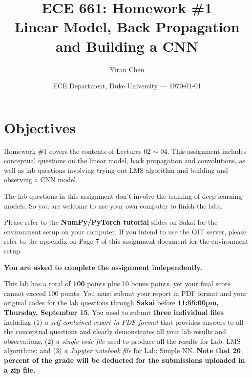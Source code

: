 \documentclass{article}
\title{ECE 661: Homework \#1 \\ Linear Model, Back Propagation and Building a CNN}
\author{Yiran Chen}
\date{ECE Department, Duke University --- \today}
\begin{document}
\maketitle %


\section*{Objectives} %
Homework \#1 covers the contents of Lectures 02 $\sim$ 04. This assignment includes conceptual questions on the linear model, back propagation and convolutions, as well as lab questions involving trying out LMS algorithm and building and observing a CNN model.

The lab questions in this assignment don't involve the training of deep learning models.
So you are welcome to use your own computer to finish the labs.

Please refer to the {\color{blue} \textbf{NumPy/PyTorch tutorial}} slides on Sakai for the environment setup on your computer. 
If you intend to use the OIT server, please refer to the appendix on Page 7 of this assignment document for the environment setup.

\begin{warn}
\textbf{You are asked to complete the assignment independently.}

\vspace{6pt}
\noindent

This lab has a total of \textbf{100} points plus 10 bonus points, yet your final score cannot exceed 100 points. 
You must submit your report in PDF format and your original codes for the lab questions through \textbf{Sakai} before {\color{blue} \textbf{11:55:00pm, Thursday, September 15}}. 
You need to submit {\color{blue} \textbf{three individual files}} including (1) \textit{a self-contained report in PDF format} that provides answers to all the conceptual questions and clearly demonstrates all your lab results and observations, (2) \textit{a single code file} used to produce all the results for Lab: LMS algorithms; and (3) \textit{a Jupyter notebook file} for Lab: Simple NN. 
{\color{red}\textbf{Note that  20 percent of the grade will be deducted for the submissions uploaded in a zip file.}}

\end{warn}



\clearpage

\end{document}
